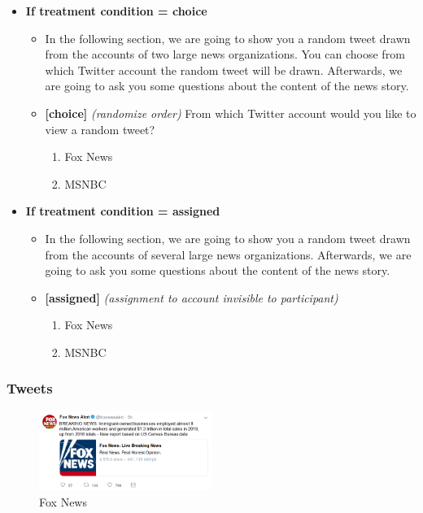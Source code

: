 \documentclass[]{article}
\providecommand{\tightlist}{%
  \setlength{\itemsep}{0pt}\setlength{\parskip}{0pt}}
\begin{document}
\begin{itemize}
\tightlist
\item
  \textbf{If treatment condition = choice}

  \begin{itemize}
  \item
    In the following section, we are going to show you a random tweet
    drawn from the accounts of two large news organizations. You can
    choose from which Twitter account the random tweet will be drawn.
    Afterwards, we are going to ask you some questions about the content
    of the news story.
  \item
    \textbf{{[}choice{]}} \emph{(randomize order)} From which Twitter
    account would you like to view a random tweet?

    \begin{enumerate}
    \def\labelenumi{\arabic{enumi}.}
    \tightlist
    \item
      Fox News
    \item
      MSNBC
    \end{enumerate}
  \end{itemize}
\item
  \textbf{If treatment condition = assigned}

  \begin{itemize}
  \item
    In the following section, we are going to show you a random tweet
    drawn from the accounts of several large news organizations.
    Afterwards, we are going to ask you some questions about the content
    of the news story.
  \item
    \textbf{{[}assigned{]}} \emph{(assignment to account invisible to
    participant)}

    \begin{enumerate}
    \def\labelenumi{\arabic{enumi}.}
    \tightlist
    \item
      Fox News
    \item
      MSNBC
    \end{enumerate}
  \end{itemize}
\end{itemize}

\hypertarget{tweets}{%
\subsubsection{Tweets}\label{tweets}}

\begin{figure}
\centering
\includegraphics[width=0.5\textwidth,height=\textheight]{../material/tweets/fox_popular.png}
\caption{Fox News}
\end{figure}
\end{document}
